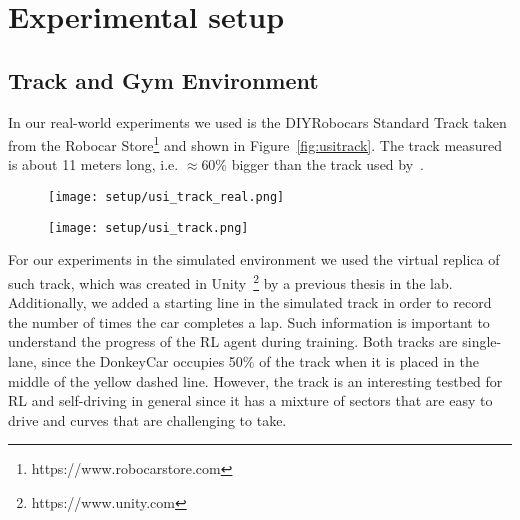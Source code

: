 \chapter{Experimental setup}


\section{Track and Gym Environment} \label{sec:track}
In our real-world experiments we used is the DIYRobocars Standard Track taken from the Robocar Store\footnote{https://www.robocarstore.com} and shown in Figure~\ref{fig:usitrack}. The track measured is about 11 meters long, i.e. $\approx$60\% bigger than the track used by~\citet{DBLP:journals/corr/abs-2008-00715}. 

\begin{figure}[h]
    \centering
\begin{minipage}{.5\textwidth}
    \centering
    \texttt{[image: setup/usi\_track\_real.png]}
    \label{fig:usitrack}
\end{minipage}%
\begin{minipage}{.5\textwidth}
    \centering
    \texttt{[image: setup/usi\_track.png]}
    \label{fig:usitracksim}
\end{minipage}
\end{figure}

For our experiments in the simulated environment we used the virtual replica of such track, which was created in Unity~\footnote{https://www.unity.com} by a previous thesis in the lab. Additionally, we added a starting line in the simulated track in order to record the number of times the car completes a lap. Such information is important to understand the progress of the RL agent during training. Both tracks are single-lane, since the DonkeyCar occupies 50\% of the track when it is placed in the middle of the yellow dashed line. However, the track is an interesting testbed for RL and self-driving in general since it has a mixture of sectors that are easy to drive and curves that are challenging to take.

